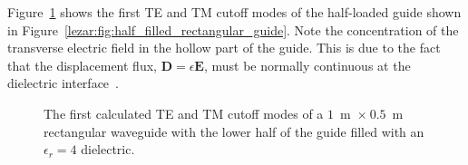 Figure~\ref{lezar:fig:half_filled_rectangular_cutoff_modes} shows the first
TE and TM cutoff modes of the half-loaded guide shown in
Figure~\ref{lezar:fig:half_filled_rectangular_guide}. Note the concentration
of the transverse electric field in the hollow part of the guide. This
is due to the fact that the displacement flux, $\mathbf{D} =
\epsilon\mathbf{E}$, must be normally continuous at the dielectric
interface~\cite{Pozar2005, Smi1997}.
\begin{figure}[h]
\centering
\caption{The first calculated TE and TM cutoff modes of a $1$~m~$\times~0.5$~m rectangular waveguide with the lower half of the guide filled with an $\epsilon_r = 4$ dielectric.}
\label{lezar:fig:half_filled_rectangular_cutoff_modes}
\end{figure}

